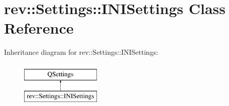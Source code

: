 \hypertarget{classrev_1_1_settings_1_1_i_n_i_settings}{}\section{rev\+::Settings\+::I\+N\+I\+Settings Class Reference}
\label{classrev_1_1_settings_1_1_i_n_i_settings}
Inheritance diagram for rev\+::Settings\+::I\+N\+I\+Settings\+:\begin{figure}[H]
\begin{center}
\leavevmode
\includegraphics[height=2.000000cm]{classrev_1_1_settings_1_1_i_n_i_settings}
\end{center}
\end{figure}
